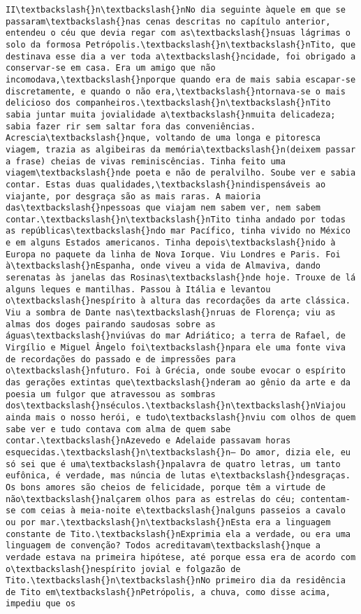 \documentclass[11pt]{article}
\begin{document}
\begin{Verbatim}[commandchars=\\\{\}]
II\textbackslash{}n\textbackslash{}nNo dia seguinte àquele em que se passaram\textbackslash{}nas cenas descritas no capítulo anterior, entendeu o céu que devia regar com as\textbackslash{}nsuas lágrimas o solo da formosa Petrópolis.\textbackslash{}n\textbackslash{}nTito, que destinava esse dia a ver toda a\textbackslash{}ncidade, foi obrigado a conservar-se em casa. Era um amigo que não incomodava,\textbackslash{}nporque quando era de mais sabia escapar-se discretamente, e quando o não era,\textbackslash{}ntornava-se o mais delicioso dos companheiros.\textbackslash{}n\textbackslash{}nTito sabia juntar muita jovialidade a\textbackslash{}nmuita delicadeza; sabia fazer rir sem saltar fora das conveniências. Acrescia\textbackslash{}nque, voltando de uma longa e pitoresca viagem, trazia as algibeiras da memória\textbackslash{}n(deixem passar a frase) cheias de vivas reminiscências. Tinha feito uma viagem\textbackslash{}nde poeta e não de peralvilho. Soube ver e sabia contar. Estas duas qualidades,\textbackslash{}nindispensáveis ao viajante, por desgraça são as mais raras. A maioria das\textbackslash{}npessoas que viajam nem sabem ver, nem sabem contar.\textbackslash{}n\textbackslash{}nTito tinha andado por todas as repúblicas\textbackslash{}ndo mar Pacífico, tinha vivido no México e em alguns Estados americanos. Tinha depois\textbackslash{}nido à Europa no paquete da linha de Nova Iorque. Viu Londres e Paris. Foi à\textbackslash{}nEspanha, onde viveu a vida de Almaviva, dando serenatas às janelas das Rosinas\textbackslash{}nde hoje. Trouxe de lá alguns leques e mantilhas. Passou à Itália e levantou o\textbackslash{}nespírito à altura das recordações da arte clássica. Viu a sombra de Dante nas\textbackslash{}nruas de Florença; viu as almas dos doges pairando saudosas sobre as águas\textbackslash{}nviúvas do mar Adriático; a terra de Rafael, de Virgílio e Miguel Ângelo foi\textbackslash{}npara ele uma fonte viva de recordações do passado e de impressões para o\textbackslash{}nfuturo. Foi à Grécia, onde soube evocar o espírito das gerações extintas que\textbackslash{}nderam ao gênio da arte e da poesia um fulgor que atravessou as sombras dos\textbackslash{}nséculos.\textbackslash{}n\textbackslash{}nViajou ainda mais o nosso herói, e tudo\textbackslash{}nviu com olhos de quem sabe ver e tudo contava com alma de quem sabe contar.\textbackslash{}nAzevedo e Adelaide passavam horas esquecidas.\textbackslash{}n\textbackslash{}n— Do amor, dizia ele, eu só sei que é uma\textbackslash{}npalavra de quatro letras, um tanto eufônica, é verdade, mas núncia de lutas e\textbackslash{}ndesgraças. Os bons amores são cheios de felicidade, porque têm a virtude de não\textbackslash{}nalçarem olhos para as estrelas do céu; contentam-se com ceias à meia-noite e\textbackslash{}nalguns passeios a cavalo ou por mar.\textbackslash{}n\textbackslash{}nEsta era a linguagem constante de Tito.\textbackslash{}nExprimia ela a verdade, ou era uma linguagem de convenção? Todos acreditavam\textbackslash{}nque a verdade estava na primeira hipótese, até porque essa era de acordo com o\textbackslash{}nespírito jovial e folgazão de Tito.\textbackslash{}n\textbackslash{}nNo primeiro dia da residência de Tito em\textbackslash{}nPetrópolis, a chuva, como disse acima, impediu que os 
\end{Verbatim}
\end{document}

